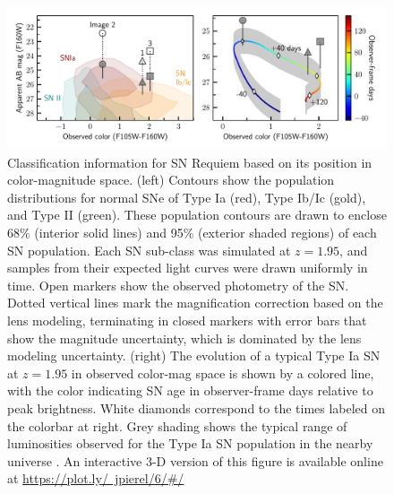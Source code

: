 \documentclass[12pt,dvipsnames]{article}
\begin{document}
\begin{figure}[h]
    \centering
    \includegraphics[draft=False, width=\textwidth]{Paper/Figures/classification_contours_timeline.pdf}
    \caption{Classification information for SN Requiem based on its position in color-magnitude space. (left) Contours show the population distributions for normal SNe of Type Ia (red), Type Ib/Ic (gold), and Type II (green).  These population contours are drawn to enclose 68\% (interior solid lines) and 95\% (exterior shaded regions) of each SN population.  Each SN sub-class was simulated at $z=1.95$, and samples from their expected light curves were drawn uniformly in time. Open markers show the observed photometry of the SN. Dotted vertical lines mark the magnification correction based on the lens modeling, terminating in closed markers with error bars that show the magnitude uncertainty, which is dominated by the lens modeling uncertainty.  (right) The evolution of a typical Type Ia SN at $z=1.95$ in observed color-mag space is shown by a colored line, with the color indicating SN age in observer-frame days relative to peak brightness.  White diamonds correspond to the times labeled on the colorbar at right. Grey shading shows the typical range of luminosities observed for the Type Ia SN population in the nearby universe \cite{wang_determination_2006}. An interactive 3-D version of this figure is available online at \href{https://plot.ly/~jpierel/6/#/}{https://plot.ly/~jpierel/6/#/}
    \label{fig:class}
    }
\end{figure}
\end{document}
